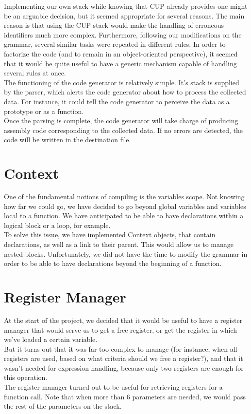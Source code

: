 \documentclass{scrartcl}
\begin{document}
Implementing our own stack while knowing that CUP already provides one might be an arguable decision, but it seemed appropriate for several reasons. The main reason is that using the CUP stack would make the handling of erroneous identifiers much more complex. Furthermore, following our modifications on the grammar, several similar tasks were repeated in different rules. In order to factorize the code (and to remain in an object-oriented perspective), it seemed that it would be quite useful to have a generic mechanism capable of handling several rules at once.\\

The functioning of the code generator is relatively simple. It's stack is supplied by the parser, which alerts the code generator about how to process the collected data. For instance, it could tell the code generator to perceive the data as a prototype or as a function.\\
Once the parsing is complete, the code generator will take charge of producing assembly code corresponding to the collected data. If no errors are detected, the code will be written in the destination file.


\section{Context}
One of the fundamental notions of compiling is the variables scope. Not knowing how far we could go, we have decided to go beyond global variables and variables local to a function. We have anticipated to be able to have declarations within a logical block or a loop, for example.\\
To solve this issue, we have implemented Context objects, that contain declarations, as well as a link to their parent. This would allow us to manage nested blocks. Unfortunately, we did not have the time to modify the grammar in order to be able to have declarations beyond the beginning of a function.


\section{Register Manager}
At the start of the project, we decided that it would be useful to have a register manager that would serve us to get a free register, or get the register in which we've loaded a certain variable.\\
But it turns out that it was far too complex to manage (for instance, when all registers are used, based on what criteria should we free a register?), and that it wasn't needed for expression handling, because only two registers are enough for this operation.\\
The register manager turned out to be useful for retrieving registers for a function call. Note that when more than 6 parameters are needed, we would pass the rest of the parameters on the stack.
\end{document}
